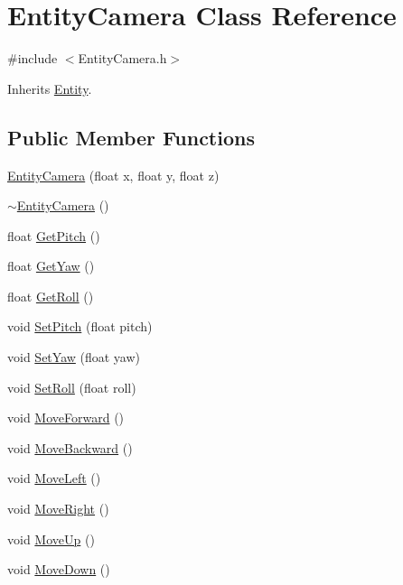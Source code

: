 \hypertarget{class_entity_camera}{\section{Entity\-Camera Class Reference}
\label{class_entity_camera}
}


{\ttfamily \#include $<$Entity\-Camera.\-h$>$}



Inherits \hyperlink{class_entity}{Entity}.

\subsection*{Public Member Functions}
\begin{DoxyCompactItemize}
\item 
\hyperlink{class_entity_camera_a9620e1ede6338a896b982d9ed1cf155b}{Entity\-Camera} (float x, float y, float z)
\item 
\hyperlink{class_entity_camera_a89476ce44c1d506d6fb7e33a7d802ccb}{$\sim$\-Entity\-Camera} ()
\item 
float \hyperlink{class_entity_camera_aecf5584aa2ff681d3b602f45c3542ae6}{Get\-Pitch} ()
\item 
float \hyperlink{class_entity_camera_a67bed0583cd3400f4c0c9c65e6d0b4f1}{Get\-Yaw} ()
\item 
float \hyperlink{class_entity_camera_aba455c38e9e7e858432d1dea729293c1}{Get\-Roll} ()
\item 
void \hyperlink{class_entity_camera_a4c365f9cfacb572e78b8fe13fa54d368}{Set\-Pitch} (float pitch)
\item 
void \hyperlink{class_entity_camera_a1f20b12f64e91a1eb35230511b183e98}{Set\-Yaw} (float yaw)
\item 
void \hyperlink{class_entity_camera_a2fb099c7b7cdc07312c9b45ac57848f1}{Set\-Roll} (float roll)
\item 
void \hyperlink{class_entity_camera_a24777d52e63164a4eace815b886ae19b}{Move\-Forward} ()
\item 
void \hyperlink{class_entity_camera_ac392d501bdfaca0cfe12005fa4f17552}{Move\-Backward} ()
\item 
void \hyperlink{class_entity_camera_af829af5ef79eefeb3f5d474b967dc9df}{Move\-Left} ()
\item 
void \hyperlink{class_entity_camera_abbed1e94d85700bb70ae42ddd9a646bc}{Move\-Right} ()
\item 
void \hyperlink{class_entity_camera_a2cf1cad6bc3906d46b4c351dda4180e0}{Move\-Up} ()
\item 
void \hyperlink{class_entity_camera_a458747cc7bfc398ac715ff9e5b34a9e9}{Move\-Down} ()
\end{DoxyCompactItemize}
